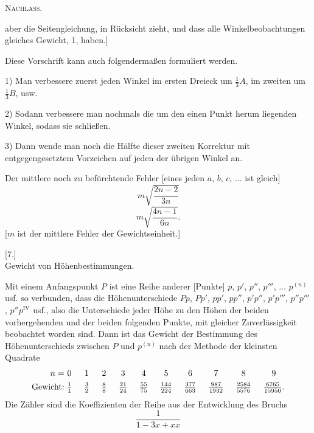 \clearpage
{}\hfill\textsc{Nachlass.}\hfill\mbox{}\par\medskip
\noindent aber die Seitengleichung, in Rücksicht zieht, und dass alle Winkelbeobachtungen gleiches Gewicht, 1, haben.]

Diese Vorschrift kann auch folgendermaßen formuliert werden.

1) Man verbessere zuerst jeden Winkel im ersten Dreieck um $\frac13A$, im zweiten um $\frac13B$, usw.

2) Sodann verbessere man nochmals die um den einen Punkt herum liegenden Winkel, sodass sie schließen.

3) Dann wende man noch die Hälfte dieser zweiten Korrektur mit entgegengesetztem Vorzeichen auf jeden der übrigen Winkel an.

Der mittlere noch zu befürchtende Fehler [eines jeden $a$, $b$, $c$, $\ldots$ ist gleich]
\[
m\sqrt{\frac{2n-2}{3n}}
\]
\[
m\sqrt{\frac{4n-1}{6n}}.
\]
[$m$ ist der mittlere Fehler der Gewichtseinheit.]
\bigskip
\begin{center}[7.]\\[5pt]Gewicht von Höhenbestimmungen.\end{center}
Mit einem Anfangspunkt $P$ ist eine Reihe anderer [Punkte] $p$, $p'$, $p''$, $p'''$, $\ldots$ $p^{(n)}$ usf. so verbunden, dass die Höhenunterschiede $Pp$, $Pp'$, $pp'$, $pp''$, $p'p''$, $p'p'''$, $p''p'''$, $p''p^{\mathrm{IV}}$ usf., also die Unterschiede jeder Höhe zu den Höhen der beiden vorhergehenden und der beiden folgenden Punkte, mit gleicher Zuverlässigkeit beobachtet worden sind. Dann ist das Gewicht der Bestimmung des Höhenunterschieds zwischen $P$ und $p^{(n)}$ nach der Methode der kleinsten Quadrate
\[
\setlength{\arraycolsep}{7pt}
\begin{array}{r@{\;}cccccccccc}
n=&0&1&2&3&4&5&6&7&8&9\\[4pt]
\text{Gewicht:}&\frac11&\frac32&\frac88&\frac{21}{24}&\frac{55}{75}&\frac{144}{224}&\frac{377}{663}&\frac{987}{1932}&\frac{2584}{5576}&\frac{6765}{15950}.
\end{array}
\]
Die Zähler sind die Koeffizienten der Reihe aus der Entwicklung des Bruchs
\[
\frac1{1-3x+xx}
\]

